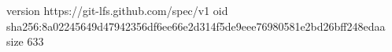 version https://git-lfs.github.com/spec/v1
oid sha256:8a02245649d47942356df6ee66e2d314f5de9eee76980581e2bd26bff248edaa
size 633
